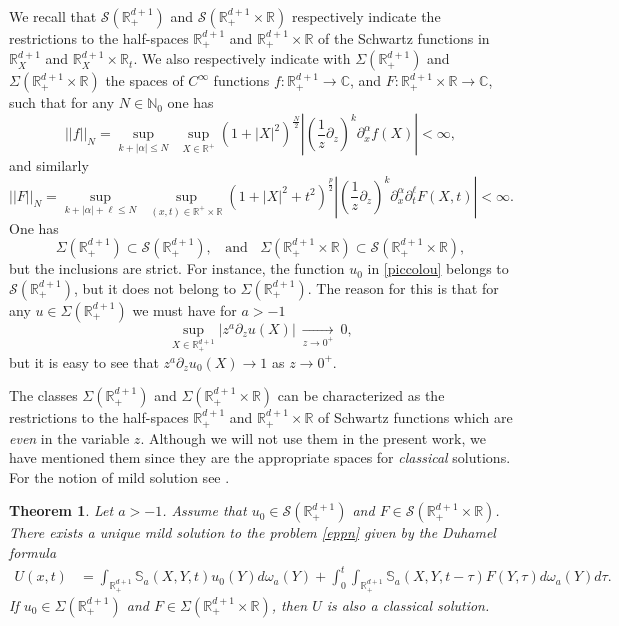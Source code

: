 \documentclass[11pt,letter]{amsart}
\def \RN {\mathbb{R}_+^{d+1}}
\def \R {\mathbb{R}}
\newcommand{\p}{\partial}
\numberwithin{equation}{section}
\newcommand{\C}{\mathbb{C}}
\newtheorem{theorem}{Theorem}[section]
\numberwithin{equation}{section}
\begin{document}
We recall that $\mathscr S(\RN)$ and $\mathscr S(\RN\times \R)$ respectively indicate the restrictions to the half-spaces $\RN$ and $\RN\times \R$ of the Schwartz functions in $\R^{d+1}_{X}$ and $\R^{d+1}_X\times \R_t$. We also respectively indicate with $\Sigma(\RN)$ and $\Sigma(\RN\times \R)$ the spaces of $C^\infty$ functions $f:\RN\to \C$, and $F:\RN\times \R\to \C$,  such that for any $N\in \mathbb N_0$ one has
\[
||f||_{N} = \underset{k+|\alpha| \le N}{\sup}\ \ \underset{X\in\R^+}{\sup} (1+|X|^2)^{\frac N2} \left|\left(\frac 1z \p_z\right)^k \p^\alpha_x f(X)\right|<\infty,
\]
and similarly
\[
||F||_{N} = \underset{k+|\alpha| +\ell \le N}{\sup}\ \ \underset{(x,t)\in\R^+\times \R}{\sup} (1+|X|^2+t^2)^{\frac p2} \left|\left(\frac 1z \p_z\right)^k \p^\alpha_x \p_t^\ell F(X,t)\right|<\infty.
\]
One has 
\[
\Sigma(\RN)\subset \mathscr S(\RN),\ \ \ \ \text{and}\ \ \ \  \Sigma(\RN\times \R)\subset \mathscr S(\RN\times \R),
\]
but the inclusions are strict. For instance, the function $u_0$ in \eqref{piccolou} belongs to $\mathscr S(\RN)$, but it does not belong to $\Sigma(\RN)$. The reason for this is that for any $u\in \Sigma(\RN)$ we must have for $a>-1$
\[
\underset{X\in \RN}{\sup} |z^a \p_z u(X)|\ \underset{z\to 0^+}{\longrightarrow}\ 0,
\] 
but it is easy to see that $z^a \p_z u_0(X)\to 1$ as $z\to 0^+$.


The classes $\Sigma(\RN)$ and $\Sigma(\RN\times \R)$  can be characterized as the restrictions to the half-spaces $\RN$ and $\RN\times \R$ of Schwartz functions which are \emph{even} in the variable $z$. Although we will not use them in the present work, we have mentioned them since they are the appropriate spaces for \emph{classical} solutions. For the notion of mild solution see \cite[Definition 2.3, p.106]{Pa}.






\begin{theorem}\label{T:Uzero}
Let $a>-1$. Assume that $u_0 \in \mathscr S(\RN)$ and $F \in \mathscr S(\RN\times \R)$.
There exists a unique mild solution to the problem \eqref{eppn} given by the Duhamel formula
\begin{align}\label{seppn}
U(x,t) & = \int_{\RN} \mathbb S_a(X,Y,t) u_0(Y) d\omega_a(Y) + \int_0^t \int_{\RN} \mathbb S_a(X,Y,t-\tau) F(Y,\tau) d\omega_a(Y) d\tau.
\end{align}
If $u_0\in \Sigma(\RN)$ and $F\in \Sigma(\RN\times \R)$, then $U$ is also a classical solution. 
\end{theorem}
\end{document}
